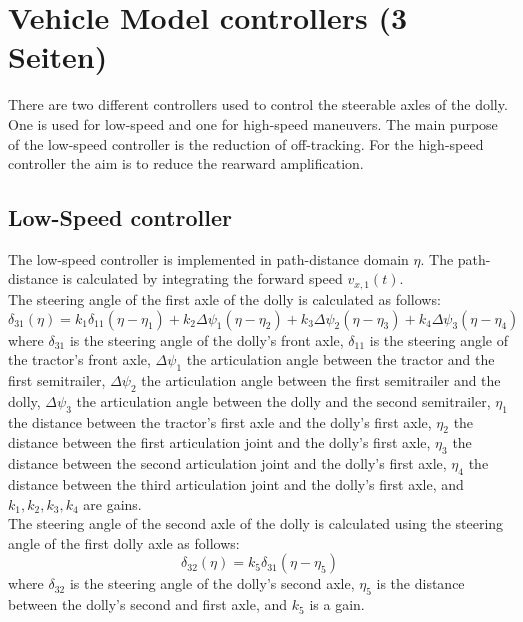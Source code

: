 \documentclass[ExampleMasters.tex]{subfiles}
\begin{document}
\clearpage
\chapter{Vehicle Model controllers (3 Seiten)}
\label{chap:steering_model}
There are two different controllers used to control the steerable axles of the dolly. One is used for low-speed and one for high-speed maneuvers. The main purpose of the low-speed controller is the reduction of off-tracking.
For the high-speed controller the aim is to reduce the rearward amplification.
\section{Low-Speed controller \cite{Low-speed_paper}}
\label{sec:low-speed_controller}
The low-speed controller is implemented in path-distance domain $\eta$. The path-distance is calculated by integrating the forward speed $v_{x,1}(t)$. \\
The steering angle of the first axle of the dolly is calculated as follows: 
\begin{equation}
\delta_{31}(\eta)=k_1\delta_{11}(\eta-\eta_1)+k_2\Delta\psi_1(\eta-\eta_2)+k_3\Delta\psi_2(\eta-\eta_3)+k_4\Delta\psi_3(\eta-\eta_4)
\end{equation}
\label{eq:delta31_lowspeed}
where $\delta_{31}$ is the steering angle of the dolly's front axle, $\delta_{11}$ is the steering angle of the tractor's front axle, $\Delta\psi_1$ the articulation angle between the tractor and the first semitrailer, $\Delta\psi_2$ the articulation angle between the first semitrailer and the dolly, $\Delta\psi_3$ the articulation angle between the dolly and the second semitrailer, $\eta_1$ the distance between the tractor's first axle and the dolly's first axle, $\eta_2$ the distance between the first articulation joint and the dolly's first axle, $\eta_3$ the distance between the second articulation joint and the dolly's first axle, $\eta_4$ the distance between the third articulation joint and the dolly's first axle, and $k_1, k_2, k_3, k_4$ are gains. 
\\The steering angle of the second axle of the dolly is calculated using the steering angle of the first dolly axle as follows:
\begin{equation}
\delta_{32}(\eta)=k_5\delta_{31}(\eta-\eta_5)
\end{equation}
\label{eq:delta32_lowspeed}
where $\delta_{32}$ is the steering angle of the dolly's second axle, $\eta_5$ is the distance between the dolly's second and first axle, and $k_5$ is a gain.\\
\end{document}
